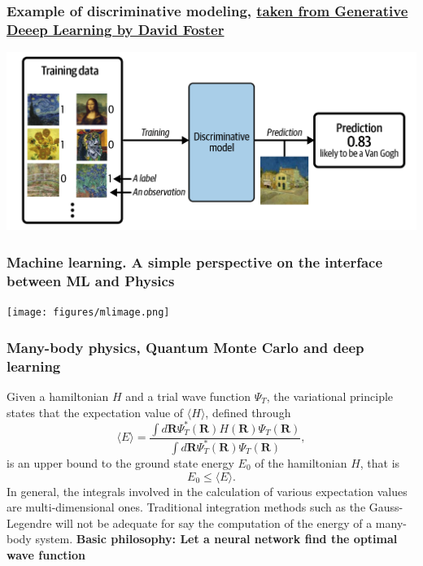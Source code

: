 \documentclass{beamer}
\begin{document}
\begin{frame}
\frametitle{Example of discriminative modeling, \href{{https://www.oreilly.com/library/view/generative-deep-learning/9781098134174/ch01.html}}{taken from Generative Deeep Learning by David Foster}}

\vspace{6mm}

\centerline{\includegraphics[width=1.0\linewidth]{figures/standarddeeplearning.png}}

\vspace{6mm}
\end{frame}

\begin{frame}
\frametitle{Machine learning. A simple perspective on the interface between ML and Physics}

\vspace{6mm}

\centerline{\texttt{[image: figures/mlimage.png]}}

\vspace{6mm}
\end{frame}

\begin{frame}
\frametitle{Many-body physics, Quantum Monte Carlo and deep learning}

\begin{block}{}
Given a hamiltonian $H$ and a trial wave function $\Psi_T$, the variational principle states that the expectation value of $\langle H \rangle$, defined through 
\[
   \langle E \rangle =
   \frac{\int d\bm{R}\Psi^{\ast}_T(\bm{R})H(\bm{R})\Psi_T(\bm{R})}
        {\int d\bm{R}\Psi^{\ast}_T(\bm{R})\Psi_T(\bm{R})},
\]
is an upper bound to the ground state energy $E_0$ of the hamiltonian $H$, that is 
\[
    E_0 \le \langle E \rangle.
\]
In general, the integrals involved in the calculation of various  expectation values  are multi-dimensional ones. Traditional integration methods such as the Gauss-Legendre will not be adequate for say the  computation of the energy of a many-body system.  \textbf{Basic philosophy: Let a neural network find the optimal wave function}
\end{block}
\end{frame}
\end{document}
